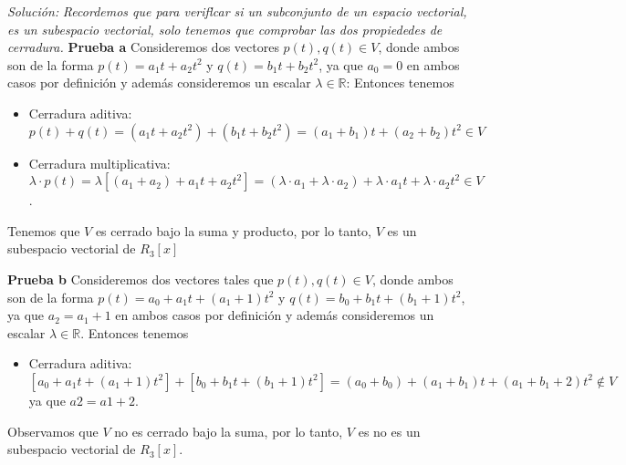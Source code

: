 \documentclass{article}
\newenvironment{solution}
    {\textit{Solución:}}
    {}
\begin{document}
\begin{solution}
    \emph{Recordemos que para veriflcar si un subconjunto de un espacio vectorial, es un subespacio vectorial, solo tenemos que comprobar las dos propiededes de cerradura.}
\textbf{Prueba a}
Consideremos dos vectores $p(t), q(t) \in V$, donde ambos son de la forma $p(t) = a_1t + a_2t^2$ y $q(t) = b_1t + b_2t^2$, ya que $a_0 = 0$ en ambos casos por definición y además consideremos un escalar $\lambda \in \mathbb{R}$: Entonces tenemos
\begin{itemize}
\item 
Cerradura aditiva: $p(t) + q(t) = (a_1t + a_2t^2) + (b_1t + b_2t^2) = (a_1 + b_1) t + (a_2 + b_2) t^2 \in V$
\item 
Cerradura multiplicativa: $\lambda \cdot p(t) = \lambda [(a_1 + a_2) + a_1t + a_2t^2] = (\lambda \cdot a_1 + \lambda \cdot a_2) + \lambda \cdot a_1t + \lambda \cdot a_2t^2 \in V$.
\end{itemize}

Tenemos que $V$ es cerrado bajo la suma y producto, por lo tanto, $V$ es un subespacio vectorial de $R_3[x]$

\textbf{Prueba b}
Consideremos dos vectores tales que $p(t), q(t) \in V$, donde ambos son de la forma $p(t) = a_0 + a_1t + (a_1 + 1) t^2$ y $q(t) = b_0 + b_1t + (b_1 + 1) t^2$, ya que $a_2 = a_1 + 1$ en ambos casos por definición y además consideremos un escalar $\lambda \in \mathbb{R}$. Entonces tenemos
\begin{itemize}
\item 
Cerradura aditiva: $[a_0 + a_1t + (a_1 + 1) t^2] + [b_0 + b_1t + (b_1 + 1) t^2] = (a_0 + b_0) + (a_1 + b_1) t + (a_1 + b_1 + 2) t^2 \notin V$ ya que $a2 = a1 + 2$.
\end{itemize}

Observamos que $V$ no es cerrado bajo la suma, por lo tanto, $V$ es no es un subespacio vectorial de  $R_3[x]$.
\end{solution}
\end{document}
